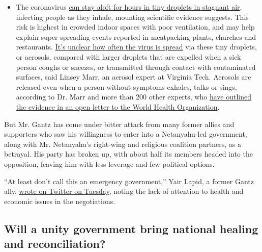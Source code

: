 \begin{itemize}
  \begin{itemize}
  \tightlist
  \item
    The coronavirus
    \href{https://www.nytimes.com/2020/07/04/health/239-experts-with-one-big-claim-the-coronavirus-is-airborne.html?action=click\&pgtype=Article\&state=default\&region=MAIN_CONTENT_3\&context=storylines_faq}{can
    stay aloft for hours in tiny droplets in stagnant air}, infecting
    people as they inhale, mounting scientific evidence suggests. This
    risk is highest in crowded indoor spaces with poor ventilation, and
    may help explain super-spreading events reported in meatpacking
    plants, churches and restaurants.
    \href{https://www.nytimes.com/2020/07/06/health/coronavirus-airborne-aerosols.html?action=click\&pgtype=Article\&state=default\&region=MAIN_CONTENT_3\&context=storylines_faq}{It's
    unclear how often the virus is spread} via these tiny droplets, or
    aerosols, compared with larger droplets that are expelled when a
    sick person coughs or sneezes, or transmitted through contact with
    contaminated surfaces, said Linsey Marr, an aerosol expert at
    Virginia Tech. Aerosols are released even when a person without
    symptoms exhales, talks or sings, according to Dr. Marr and more
    than 200 other experts, who
    \href{https://academic.oup.com/cid/article/doi/10.1093/cid/ciaa939/5867798}{have
    outlined the evidence in an open letter to the World Health
    Organization}.
  \end{itemize}
\end{itemize}

But Mr. Gantz has come under bitter attack from many former allies and
supporters who saw his willingness to enter into a Netanyahu-led
government, along with Mr. Netanyahu's right-wing and religious
coalition partners, as a betrayal. His party has broken up, with about
half its members headed into the opposition, leaving him with less
leverage and few political options.

``At least don't call this an emergency government,'' Yair Lapid, a
former Gantz ally,
\href{https://twitter.com/yairlapid/status/1249954842640093185}{wrote on
Twitter on Tuesday}, noting the lack of attention to health and economic
issues in the negotiations.

\hypertarget{will-a-unity-government-bring-national-healing-and-reconciliation}{%
\subsection{Will a unity government bring national healing and
reconciliation?}\label{will-a-unity-government-bring-national-healing-and-reconciliation}}

